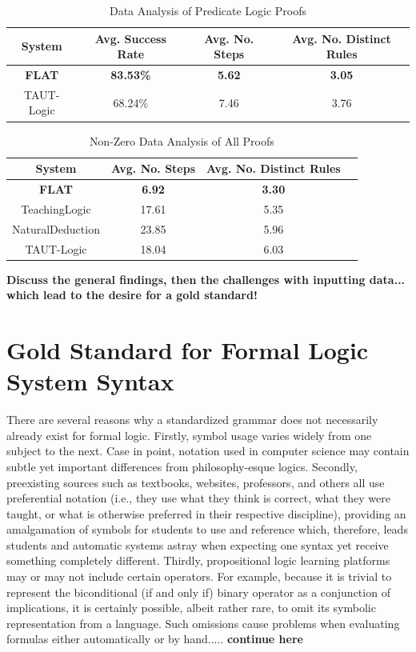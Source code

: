 \documentclass[ms]{uncgdissertationexp2}
\theoremstyle{plain}
\theoremstyle{definition}
\theoremstyle{remark}
\begin{document}
\begin{table}[!ht]
	\centering
	\caption{Data Analysis of Predicate Logic Proofs}
	\begin{tabularx}{\textwidth}{*4c}
		\toprule
		System        & Avg. Success Rate & Avg. No. Steps & Avg. No. Distinct Rules \\    
		\midrule
		\textbf{FLAT} & \textbf{83.53\%}  & \textbf{5.62}  & \textbf{3.05}           \\
		TAUT-Logic    & 68.24\%           & 7.46           & 3.76                    \\
		\bottomrule
	\end{tabularx}
	\label{table:predData}
\end{table}

\begin{table}[!ht]
	\centering
	\caption{Non-Zero Data Analysis of All Proofs}
	\begin{tabularx}{\textwidth}{*4c}
		\toprule
		System           & Avg. No. Steps & Avg. No. Distinct Rules \\    
		\midrule
		\textbf{FLAT}    & \textbf{6.92}  & \textbf{3.30}           \\
		TeachingLogic    & 17.61          & 5.35                    \\
		NaturalDeduction & 23.85          & 5.96                    \\
		TAUT-Logic       & 18.04          & 6.03                    \\
		\bottomrule
	\end{tabularx}
	\label{table:nzAllData}
\end{table}

\textbf{Discuss the general findings, then the challenges with inputting data... which lead to the desire for a gold standard!}    

\section{Gold Standard for Formal Logic System Syntax}
There are several reasons why a standardized grammar does not necessarily already exist for formal logic. Firstly, symbol usage varies widely from one subject to the next. Case in point, notation used in computer science may contain subtle yet important differences from philosophy-esque logics. Secondly, preexisting sources such as textbooks, websites, professors, and others all use preferential notation (i.e., they use what they think is correct, what they were taught, or what is otherwise preferred in their respective discipline), providing an amalgamation of symbols for students to use and reference which, therefore, leads students and automatic systems astray when expecting one syntax yet receive something completely different. Thirdly, propositional logic learning platforms may or may not include certain operators. For example, because it is trivial to represent the biconditional (if and only if) binary operator as a conjunction of implications, it is certainly possible, albeit rather rare, to omit its symbolic representation from a language. Such omissions cause problems when evaluating formulas either automatically or by hand..... \textbf{continue here}
\end{document}
